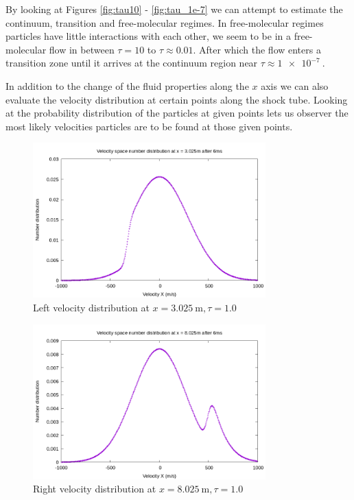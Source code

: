 \documentclass[paper=a4, fontsize=12pt]{scrartcl}
\begin{document}
\noindent
By looking at Figures \ref{fig:tau10} - \ref{fig:tau_1e-7} we can attempt to estimate the
continuum, transition and free-molecular regimes.
In free-molecular regimes particles have little interactions with each other, we seem to be in a
free-molecular flow in between $\tau = 10$ to $\tau \approx 0.01$.
After which the flow enters a transition zone until it arrives at the continuum region near
$\tau \approx \SI{1e-7}{}$.

\noindent
In addition to the change of the fluid properties along the $x$ axis we can also
evaluate the velocity distribution at certain points along the shock tube.
Looking at the probability distribution of the particles at given points lets us
observer the most likely velocities particles are to be found at those given points.

\begin{figure}[H]
        \centering
        \includegraphics[width=0.8\textwidth]{left_f-t}
        \caption{Left velocity distribution at $x = \SI{3.025}{\meter}, \tau = 1.0$ }
        \label{fig:left_f-t}
\end{figure}
\begin{figure}[H]
        \centering
        \includegraphics[width=0.8\textwidth]{right_f-t}
        \caption{Right velocity distribution at $x = \SI{8.025}{\meter}, \tau = 1.0$ }
        \label{fig:right_f-t}
\end{figure}
\end{document}
